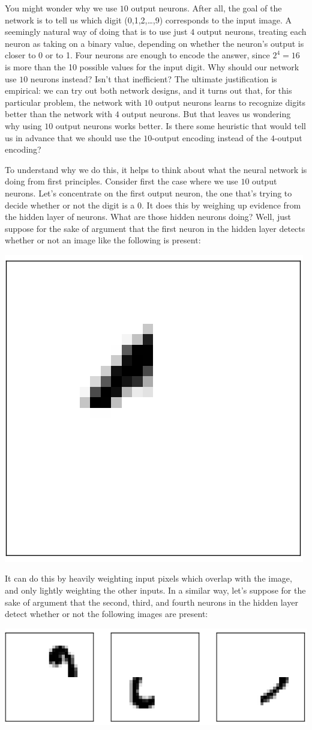 \documentclass[a4paper,12pt]{report}%
\begin{document}
You might wonder why we use $10$ output neurons. After all, the goal of the network is to tell us which digit (0,1,2,…,9) corresponds to the input image. A seemingly natural way of doing that is to use just $4$ output neurons, treating each neuron as taking on a binary value, depending on whether the neuron's output is closer to 0 or to 1. Four neurons are enough to encode the answer, since $2^{4}=16$ is more than the 10 possible values for the input digit. Why should our network use $10$ neurons instead? Isn't that inefficient? The ultimate justification is empirical: we can try out both network designs, and it turns out that, for this particular problem, the network with $10$ output neurons learns to recognize digits better than the network with $4$ output neurons. But that leaves us wondering why using $10$ output neurons works better. Is there some heuristic that would tell us in advance that we should use the $10$-output encoding instead of the $4$-output encoding?

To understand why we do this, it helps to think about what the neural network is doing from first principles. Consider first the case where we use $10$ output neurons. Let's concentrate on the first output neuron, the one that's trying to decide whether or not the digit is a $0$. It does this by weighing up evidence from the hidden layer of neurons. What are those hidden neurons doing? Well, just suppose for the sake of argument that the first neuron in the hidden layer detects whether or not an image like the following is present:
\begin{center}
 \includegraphics[width=0.15\linewidth]{images/mnist_top_left_feature.png}
\end{center}

It can do this by heavily weighting input pixels which overlap with the image, and only lightly weighting the other inputs. In a similar way, let's suppose for the sake of argument that the second, third, and fourth neurons in the hidden layer detect whether or not the following images are present:
\begin{center}
 \includegraphics[width=0.5\linewidth]{images/mnist_other_features.png}
\end{center}
\end{document}
